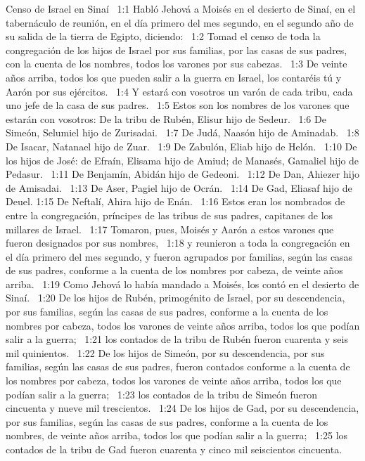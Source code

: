 Censo de Israel en Sinaí  
1:1 Habló Jehová a Moisés en el desierto de Sinaí, en el tabernáculo de reunión, en el día primero del mes segundo, en el segundo año de su salida de la tierra de Egipto, diciendo:  
1:2 Tomad el censo de toda la congregación de los hijos de Israel por sus familias, por las casas de sus padres, con la cuenta de los nombres, todos los varones por sus cabezas.  
1:3 De veinte años arriba, todos los que pueden salir a la guerra en Israel, los contaréis tú y Aarón por sus ejércitos.  
1:4 Y estará con vosotros un varón de cada tribu, cada uno jefe de la casa de sus padres.  
1:5 Estos son los nombres de los varones que estarán con vosotros: De la tribu de Rubén, Elisur hijo de Sedeur.  
1:6 De Simeón, Selumiel hijo de Zurisadai.  
1:7 De Judá, Naasón hijo de Aminadab.  
1:8 De Isacar, Natanael hijo de Zuar.  
1:9 De Zabulón, Eliab hijo de Helón.  
1:10 De los hijos de José: de Efraín, Elisama hijo de Amiud; de Manasés, Gamaliel hijo de Pedasur.  
1:11 De Benjamín, Abidán hijo de Gedeoni.  
1:12 De Dan, Ahiezer hijo de Amisadai.  
1:13 De Aser, Pagiel hijo de Ocrán.  
1:14 De Gad, Eliasaf hijo de Deuel. 
1:15 De Neftalí, Ahira hijo de Enán.  
1:16 Estos eran los nombrados de entre la congregación, príncipes de las tribus de sus padres, capitanes de los millares de Israel.  
1:17 Tomaron, pues, Moisés y Aarón a estos varones que fueron designados por sus nombres,  
1:18 y reunieron a toda la congregación en el día primero del mes segundo, y fueron agrupados por familias, según las casas de sus padres, conforme a la cuenta de los nombres por cabeza, de veinte años arriba.  
1:19 Como Jehová lo había mandado a Moisés, los contó en el desierto de Sinaí.  
1:20 De los hijos de Rubén, primogénito de Israel, por su descendencia, por sus familias, según las casas de sus padres, conforme a la cuenta de los nombres por cabeza, todos los varones de veinte años arriba, todos los que podían salir a la guerra;  
1:21 los contados de la tribu de Rubén fueron cuarenta y seis mil quinientos.  
1:22 De los hijos de Simeón, por su descendencia, por sus familias, según las casas de sus padres, fueron contados conforme a la cuenta de los nombres por cabeza, todos los varones de veinte años arriba, todos los que podían salir a la guerra;  
1:23 los contados de la tribu de Simeón fueron cincuenta y nueve mil trescientos.  
1:24 De los hijos de Gad, por su descendencia, por sus familias, según las casas de sus padres, conforme a la cuenta de los nombres, de veinte años arriba, todos los que podían salir a la guerra;  
1:25 los contados de la tribu de Gad fueron cuarenta y cinco mil seiscientos cincuenta.  
